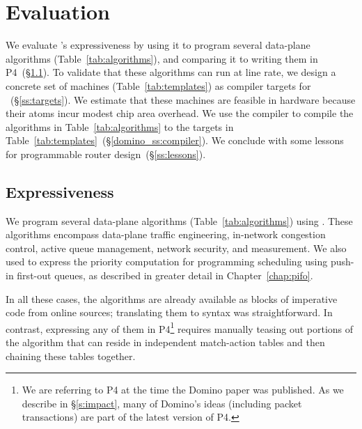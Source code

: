 \section{Evaluation}
\label{s:eval}



We evaluate \pktlanguage's expressiveness by using it to program several
data-plane algorithms (Table~\ref{tab:algorithms}), and comparing it to writing
them in P4~(\S\ref{ss:expressiveness}). To validate that these
algorithms can run at line rate, we design a concrete set of \absmachine
machines (Table~\ref{tab:templates}) as compiler targets for
\pktlanguage~(\S\ref{ss:targets}).  We estimate that these machines are
feasible in hardware because their atoms incur modest chip area overhead.  We
use the \pktlanguage compiler to compile the algorithms in
Table~\ref{tab:algorithms} to the targets in
Table~\ref{tab:templates}~(\S\ref{domino_ss:compiler}).  We conclude with some
lessons for programmable router design~(\S\ref{ss:lessons}).

\subsection{Expressiveness}
\label{ss:expressiveness}

We program several data-plane algorithms (Table~\ref{tab:algorithms}) using
\pktlanguage. These algorithms encompass data-plane traffic engineering,
in-network congestion control, active queue management, network security, and
measurement. We also used \pktlanguage to express the priority computation for
programming scheduling using push-in first-out queues, as described in greater
detail in Chapter~\ref{chap:pifo}.

In all these cases, the algorithms are already available as blocks of
imperative code from online sources; translating them to \pktlanguage syntax
was straightforward. In contrast, expressing any of them in P4\footnote{We are
referring to P4 at the time the Domino paper was published. As we describe in
\S\ref{s:impact}, many of Domino's ideas (including packet transactions) are
part of the latest version of P4.}
requires manually teasing out portions of the algorithm that can reside in
independent match-action tables and then chaining these tables together.

